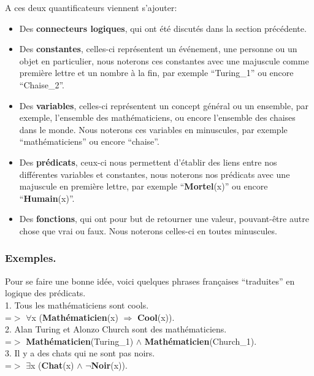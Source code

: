 \documentclass[a4paper, 12pt]{article}
\newcommand{\imply}{\Rightarrow}
\numberwithin{equation}{subsection}
\begin{document}
A ces deux quantificateurs viennent s'ajouter:
\begin{itemize}
  \item Des {\bf connecteurs logiques}, qui ont été discutés dans la section précédente.
  \item Des {\bf constantes}, celles-ci représentent un événement, une personne ou un objet en particulier, nous noterons ces constantes avec une majuscule comme première lettre et un nombre à la fin, par exemple ``Turing\_1'' ou encore ``Chaise\_2''.
  \item Des {\bf variables}, celles-ci représentent un concept général ou un ensemble, par exemple, l'ensemble des mathématiciens, ou encore l'ensemble des chaises dans le monde. Nous noterons ces variables en minuscules, par exemple ``mathématiciens'' ou encore ``chaise''.
  \item Des {\bf prédicats}, ceux-ci nous permettent d'établir des liens entre nos différentes variables et constantes, nous noterons nos prédicats avec une majuscule en première lettre, par exemple ``{\bf Mortel}(x)'' ou encore ``{\bf Humain}(x)''.
  \item Des {\bf fonctions}, qui ont pour but de retourner une valeur, pouvant-être autre chose que vrai ou faux. Nous noterons celles-ci en toutes minuscules.
\end{itemize}

\subsubsection{Exemples.}
Pour se faire une bonne idée, voici quelques phrases françaises ``traduites'' en logique des prédicats. \\[0.5cm]
1. Tous les mathématiciens sont cools. \\
=$>$ $\forall$x ({\bf Mathématicien}(x) $\imply$ {\bf Cool}(x)). \\[0.2cm]
2. Alan Turing et Alonzo Church sont des mathématiciens. \\
=$>$ {\bf Mathématicien}(Turing\_1) $\land$ {\bf Mathématicien}(Church\_1). \\[0.2cm]
3. Il y a des chats qui ne sont pas noirs. \\
=$>$ $\exists$x ({\bf Chat}(x) $\land$ $\neg${\bf Noir}(x)). \\[0.2cm]
\end{document}

